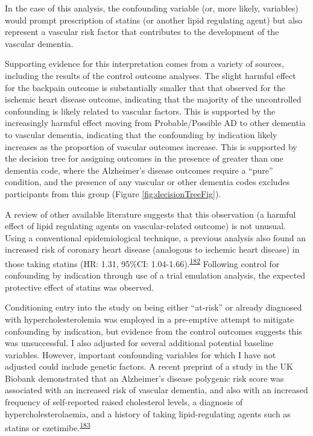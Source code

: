 \documentclass[a4paper, twoside]{templates/ociamthesis}
\begin{document}
In the case of this analysis, the confounding variable (or, more likely, variables) would prompt prescription of statins (or another lipid regulating agent) but also represent a vascular risk factor that contributes to the development of the vascular dementia.

Supporting evidence for this interpretation comes from a variety of sources, including the results of the control outcome analyses. The slight harmful effect for the backpain outcome is substantially smaller that that observed for the ischemic heart disease outcome, indicating that the majority of the uncontrolled confounding is likely related to vascular factors. This is supported by the increasingly harmful effect moving from Probable/Possible AD to other dementia to vascular dementia, indicating that the confounding by indication likely increases as the proportion of vascular outcomes increase. This is supported by the decision tree for assigning outcomes in the presence of greater than one dementia code, where the Alzheimer's disease outcomes require a ``pure'' condition, and the presence of any vascular or other dementia codes excludes participants from this group (Figure \ref{fig:decisionTreeFig}).

A review of other available literature suggests that this observation (a harmful effect of lipid regulating agents on vascular-related outcome) is not unusual. Using a conventional epidemiological technique, a previous analysis also found an increased risk of coronary heart disease (analogous to ischemic heart disease) in those taking statins (HR: 1.31, 95\%CI: 1.04-1.66).\textsuperscript{\protect\hyperlink{ref-danaei2013b}{182}} Following control for confounding by indication through use of a trial emulation analysis, the expected protective effect of statins was observed.

Conditioning entry into the study on being either ``at-risk'' or already diagnosed with hypercholesterolemia was employed in a pre-emptive attempt to mitigate confounding by indication, but evidence from the control outcomes suggests this was unsuccessful. I also adjusted for several additional potential baseline variables. However, important confounding variables for which I have not adjusted could include genetic factors. A recent preprint of a study in the UK Biobank demonstrated that an Alzheimer's disease polygenic risk score was associated with an increased risk of vascular dementia, and also with an increased frequency of self-reported raised cholesterol levels, a diagnosis of hypercholesterolaemia, and a history of taking lipid-regulating agents such as statins or ezetimibe.\textsuperscript{\protect\hyperlink{ref-korologou-linden2020}{183}}
\end{document}

